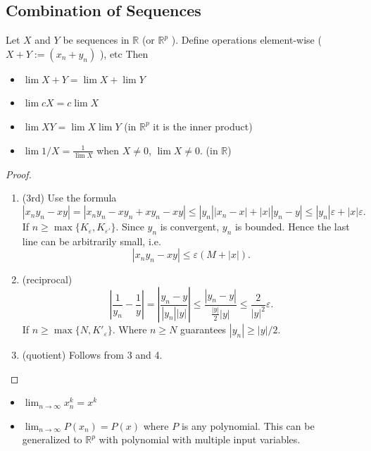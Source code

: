 

\subsection{Combination of Sequences}

\begin{theorem}
	Let $X$ and $Y$ be sequences in $\mathbb{R}$ (or $\mathbb{R}^p$ ). 
	Define operations element-wise ($X + Y := (x_n + y_n)$ ), etc
	Then
	\begin{itemize}
		\item $\lim X + Y = \lim X + \lim Y$
		\item $\lim c X = c \lim X$
		\item $\lim XY = \lim X \lim Y$ (in $\mathbb{R}^p$ it is the inner product)
		\item $\lim 1 / X = \frac{1}{\lim X}$ when $X \neq 0$, $\lim X \neq 0$. (in $\mathbb{R}$)
	\end{itemize}
\end{theorem}
\begin{proof}
	\begin{enumerate}
		\item (3rd) Use the formula \[
			|x_n y_n - xy|
			= |x_ny_n - xy_n + xy_n - xy|
			\le |y_n| |x_n - x| + |x| |y_n - y|
			\le |y_n|\varepsilon + |x| \varepsilon
		.\] 
		If $n \ge \max \{K_\varepsilon, K_{\varepsilon'}\} $. Since $y_n$ is convergent, $y_n$ is bounded. Hence the last line can be arbitrarily small, i.e.\[
			|x_n y_n - xy|
			\le \varepsilon(M + |x|)
		.\] 
	\item (reciprocal) 
		\[
			\left| \frac{1}{y_n} - \frac{1}{y} \right| 
			= \left| \frac{y_n - y}{|y_n| |y|} \right| 
			\le \frac{|y_n - y|}{\frac{|y|}{2}|y|}
			\le \frac{2}{|y|^2}\varepsilon
		.\] 
		If $n \ge \max\{N, K'_\varepsilon\}$.  Where $n\ge N$ guarantees $|y_n| \ge |y|/2$.
	\item (quotient) Follows from 3 and 4.
	\end{enumerate}
\end{proof}

\begin{corollary}
	\begin{itemize}
		\item $\lim_{n \to \infty} x_n^k = x^k$ 
		\item $\lim_{n \to \infty} P(x_n) = P(x)$ where $P$ is any polynomial. This can be generalized to $\mathbb{R}^p$ with polynomial with multiple input variables.
	\end{itemize}
\end{corollary}

